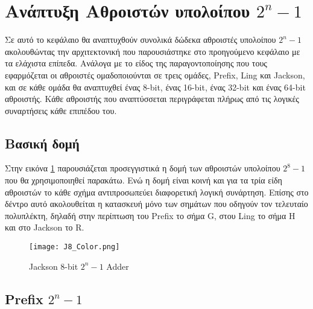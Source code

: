\section{Ανάπτυξη Αθροιστών υπολοίπου $2^n-1$ }

Σε αυτό το κεφάλαιο θα αναπτυχθούν συνολικά δώδεκα αθροιστές υπολοίπου $2^n-1$
ακολουθώντας την αρχιτεκτονική που παρουσιάστηκε στο προηγούμενο κεφάλαιο 
με τα ελάχιστα επίπεδα. Ανάλογα με το είδος της παραγοντοποίησης που τους εφαρμόζεται 
οι αθροιστές ομαδοποιούνται σε τρεις ομάδες, Prefix, Ling και Jackson,
και σε κάθε ομάδα θα αναπτυχθεί ένας 8-bit, ένας 16-bit, ένας 32-bit και ένας 64-bit 
αθροιστής. Κάθε αθροιστής που αναπτύσσεται περιγράφεται πλήρως από τις λογικές 
συναρτήσεις κάθε επιπέδου του. 





\subsection{Βασική δομή}
Στην εικόνα \ref{2^8-1_Tree_2x4} παρουσιάζεται προσεγγιστικά η δομή των αθροιστών υπολοίπου $2^8-1$ 
που θα χρησιμοποιηθεί παρακάτω. Ενώ η δομή είναι κοινή και για τα τρία είδη αθροιστών το κάθε σχήμα 
αντιπροσωπεύει διαφορετική λογική συνάρτηση. Επίσης στο δέντρο αυτό ακολουθείται η κατασκευή μόνο 
των σημάτων που οδηγούν τον τελευταίο πολυπλέκτη, δηλαδή στην περίπτωση του Prefix το σήμα G, στου Ling
το σήμα H και στο Jackson το R.
\begin{figure}[H]
\centering
\texttt{[image: J8\_Color.png]}
\caption{Jackson 8-bit $2^n-1$ Adder}
\label{2^8-1_Tree_2x4}
\end{figure}







\subsection{Prefix $2^n-1$}



